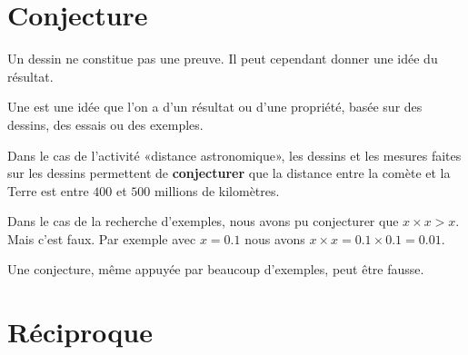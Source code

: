 


\section{Conjecture}

\begin{Aretenir}
    Un dessin ne constitue pas une preuve. Il peut cependant donner une idée du résultat.
\end{Aretenir}

\begin{definition}
    Une  est une idée que l'on a d'un résultat ou d'une propriété, basée sur des dessins, des essais ou des exemples.
\end{definition}

\begin{example}
    Dans le cas de l'activité «distance astronomique», les dessins et les mesures faites sur les dessins permettent de {\bf conjecturer} que la distance entre la comète et la Terre est entre \( 400\) et \( 500\) millions de kilomètres.
\end{example}

Dans le cas de la recherche d'exemples, nous avons pu conjecturer que \( x\times x >x\). Mais c'est faux. Par exemple avec \( x=0.1\) nous avons \( x\times x=0.1\times 0.1=0.01\).

\begin{Aretenir}
    Une conjecture, même appuyée par beaucoup d'exemples, peut être fausse.
\end{Aretenir}

\section{Réciproque}

